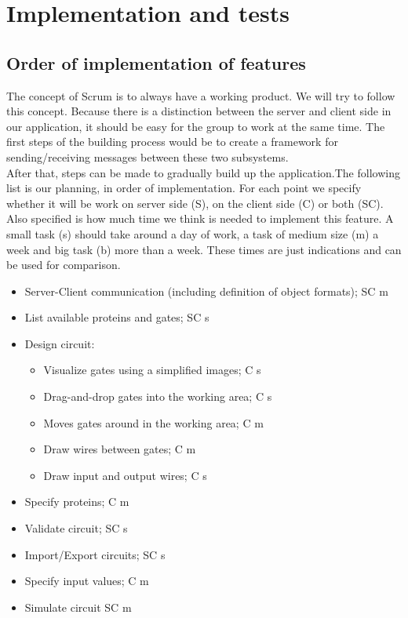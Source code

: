 \documentclass[a4paper]{article}
\begin{document}
\section{Implementation and tests}

\subsection{Order of implementation of features}
The concept of Scrum is to always have a working product. We will try to follow this concept. Because there is a distinction between the server and client side in our application, it should be easy for the group to work at the same time. The first steps of the building process would be to create a framework for sending/receiving messages between these two subsystems. \\

\noindent After that, steps can be made to gradually build up the application.The following list is our planning, in order of implementation. For each point we specify whether it will be work on server side (S), on the client side (C) or both (SC). Also specified is how much time we think is needed to implement this feature. A small task (s) should take around a day of work, a task of medium size (m) a week and big task (b) more than a week. These times are just indications and can be used for comparison.
\begin{itemize}
\item Server-Client communication (including definition of object formats);	\tabto{13.8cm} SC \tabto{14.6cm} m
\item List available proteins and gates; 									\tabto{13.8cm} SC \tabto{14.6cm} s
\item Design circuit:													%
	\begin{itemize}
	\item Visualize gates using a simplified images;						\tabto{13cm}  C \tabto{13.8cm} s
	\item Drag-and-drop gates into the working area;						\tabto{13cm}  C \tabto{13.8cm} s
	\item Moves gates around in the working area;							\tabto{13cm}  C \tabto{13.8cm} m
	\item Draw wires between gates;											\tabto{13cm}  C \tabto{13.8cm} m
	\item Draw input and output wires;										\tabto{13cm}  C \tabto{13.8cm} s
	\end{itemize}
\item Specify proteins;														\tabto{13.8cm}  C \tabto{14.6cm} m
\item Validate circuit;														\tabto{13.8cm} SC \tabto{14.6cm} s
\item Import/Export circuits;												\tabto{13.8cm} SC \tabto{14.6cm} s
\item Specify input values;													\tabto{13.8cm}  C \tabto{14.6cm} m
\item Simulate circuit														\tabto{13.8cm} SC \tabto{14.6cm} m
\end{itemize}~\\
\end{document}
